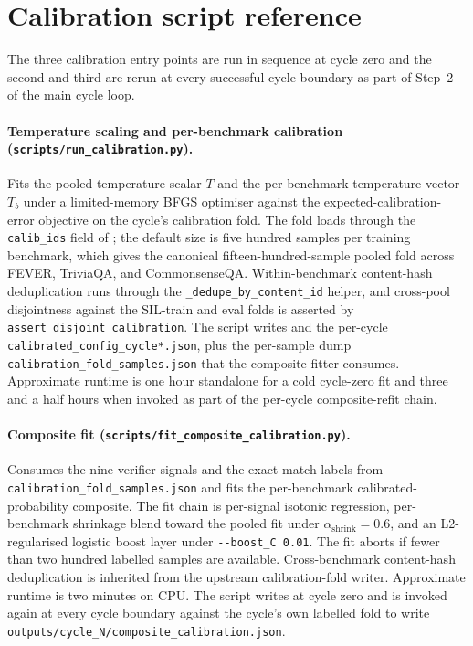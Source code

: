\section{Calibration script reference}
\label{app:calibration-scripts}

The three calibration entry points are run in sequence at cycle zero and the second and third are rerun at every successful cycle boundary as part of Step~2 of the main cycle loop.

\paragraph{Temperature scaling and per-benchmark calibration (\texttt{scripts/run\_calibration.py}).} Fits the pooled temperature scalar $T$ and the per-benchmark temperature vector $T_{b}$ under a limited-memory BFGS optimiser against the expected-calibration-error objective on the cycle's calibration fold. The fold loads through the \verb|calib_ids| field of ; the default size is five hundred samples per training benchmark, which gives the canonical fifteen-hundred-sample pooled fold across FEVER, TriviaQA, and CommonsenseQA. Within-benchmark content-hash deduplication runs through the \verb|_dedupe_by_content_id| helper, and cross-pool disjointness against the SIL-train and eval folds is asserted by \verb|assert_disjoint_calibration|. The script writes  and the per-cycle \verb|calibrated_config_cycle*.json|, plus the per-sample dump \verb|calibration_fold_samples.json| that the composite fitter consumes. Approximate runtime is one hour standalone for a cold cycle-zero fit and three and a half hours when invoked as part of the per-cycle composite-refit chain.

\paragraph{Composite fit (\texttt{scripts/fit\_composite\_calibration.py}).} Consumes the nine verifier signals and the exact-match labels from \verb|calibration_fold_samples.json| and fits the per-benchmark calibrated-probability composite. The fit chain is per-signal isotonic regression, per-benchmark shrinkage blend toward the pooled fit under $\alpha_{\text{shrink}} = 0.6$, and an L2-regularised logistic boost layer under \verb|--boost_C 0.01|. The fit aborts if fewer than two hundred labelled samples are available. Cross-benchmark content-hash deduplication is inherited from the upstream calibration-fold writer. Approximate runtime is two minutes on CPU. The script writes  at cycle zero and is invoked again at every cycle boundary against the cycle's own labelled fold to write \verb|outputs/cycle_N/composite_calibration.json|.

